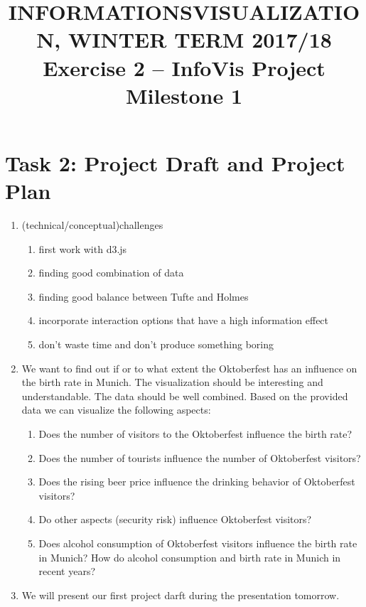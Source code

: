 \documentclass[11pt, twoside, BCOR=8mm, DIV=12]{scrartcl}
\title{{\Large INFORMATIONSVISUALIZATION, WINTER TERM 2017/18} \\ Exercise 2 – InfoVis Project Milestone 1}
\begin{document}
\maketitle
\section*{Task 2: Project Draft and Project Plan}
\begin{enumerate}[label=\alph*)]
\item (technical/conceptual)challenges
\begin{enumerate}[label=\arabic*)]
\item first work with d3.js
\item finding good combination of data
\item finding good balance between Tufte and Holmes
\item incorporate interaction options that have a high information effect
\item don't waste time and don't produce something boring
\end{enumerate}
\item We want to find out if or to what extent the Oktoberfest has an influence on the birth rate in Munich.
The visualization should be interesting and understandable.
The data should be well combined.
Based on the provided data we can visualize the following aspects:
\begin{enumerate}[label=\arabic*)]
\item Does the number of visitors to the Oktoberfest influence the birth rate?
\item Does the number of tourists influence the number of Oktoberfest visitors?
\item Does the rising beer price influence the drinking behavior of Oktoberfest visitors?
\item Do other aspects (security risk) influence Oktoberfest visitors?
\item Does alcohol consumption of  Oktoberfest visitors influence the birth rate in Munich? How do alcohol consumption and birth rate in Munich in recent years?
\end{enumerate}
\item We will present our first project darft during the presentation tomorrow.
\end{enumerate}
\end{document}
